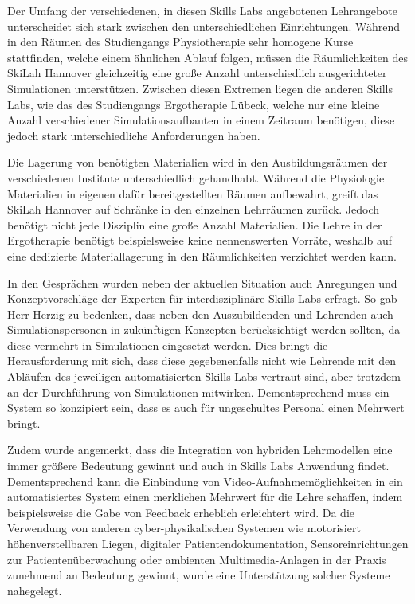 Der Umfang der verschiedenen, in diesen Skills Labs angebotenen Lehrangebote unterscheidet sich stark zwischen den unterschiedlichen Einrichtungen. Während in den Räumen des Studiengangs Physiotherapie sehr homogene Kurse stattfinden, welche einem ähnlichen Ablauf folgen, müssen die Räumlichkeiten des SkiLah Hannover gleichzeitig eine große Anzahl unterschiedlich ausgerichteter Simulationen unterstützen. Zwischen diesen Extremen liegen die anderen Skills Labs, wie das des Studiengangs Ergotherapie Lübeck, welche nur eine kleine Anzahl verschiedener Simulationsaufbauten in einem Zeitraum benötigen, diese jedoch stark unterschiedliche Anforderungen haben.

Die Lagerung von benötigten Materialien wird in den Ausbildungsräumen der verschiedenen Institute unterschiedlich gehandhabt. Während die Physiologie Materialien in eigenen dafür bereitgestellten Räumen aufbewahrt, greift das SkiLah Hannover auf Schränke in den einzelnen Lehrräumen zurück. Jedoch benötigt nicht jede Disziplin eine große Anzahl Materialien. Die Lehre in der Ergotherapie benötigt beispielsweise keine nennenswerten Vorräte, weshalb auf eine dedizierte Materiallagerung in den Räumlichkeiten verzichtet werden kann.

In den Gesprächen wurden neben der aktuellen Situation auch Anregungen und Konzeptvorschläge der Experten für interdisziplinäre Skills Labs erfragt. So gab Herr Herzig zu bedenken, dass neben den Auszubildenden und Lehrenden auch Simulationspersonen in zukünftigen Konzepten berücksichtigt werden sollten, da diese vermehrt in Simulationen eingesetzt werden. Dies bringt die Herausforderung mit sich, dass diese gegebenenfalls nicht wie Lehrende mit den Abläufen des jeweiligen automatisierten Skills Labs vertraut sind, aber trotzdem an der Durchführung von Simulationen mitwirken. Dementsprechend muss ein System so konzipiert sein, dass es auch für ungeschultes Personal einen Mehrwert bringt.

Zudem wurde angemerkt, dass die Integration von hybriden Lehrmodellen eine immer größere Bedeutung gewinnt und auch in Skills Labs Anwendung findet. Dementsprechend kann die Einbindung von Video-Aufnahmemöglichkeiten in ein automatisiertes System einen merklichen Mehrwert für die Lehre schaffen, indem beispielsweise die Gabe von Feedback erheblich erleichtert wird. Da die Verwendung von anderen cyber-physikalischen Systemen wie motorisiert höhenverstellbaren Liegen, digitaler Patientendokumentation, Sensoreinrichtungen zur Patientenüberwachung oder ambienten Multimedia-Anlagen in der Praxis zunehmend an Bedeutung gewinnt, wurde eine Unterstützung solcher Systeme nahegelegt.

